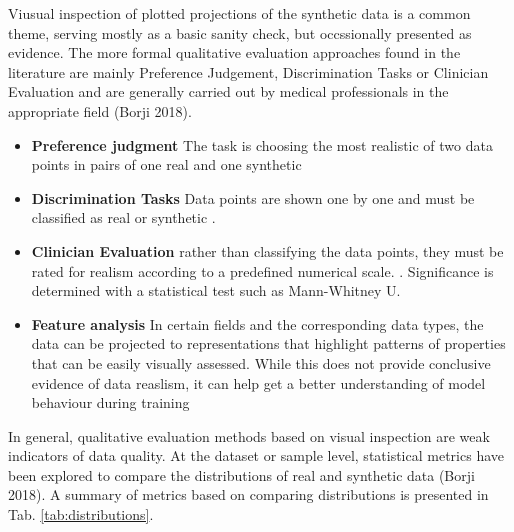         Viusual inspection of plotted projections of the synthetic data is a common theme, serving mostly as a basic sanity check, but occssionally presented as evidence. The more formal qualitative evaluation approaches found in the literature are mainly Preference Judgement, Discrimination Tasks or Clinician Evaluation and are generally carried out by medical professionals in the appropriate field (Borji 2018).
            \begin{itemize}
                \item \textbf{Preference judgment} The task is choosing the most realistic of two data points in pairs of one real and one synthetic \cite{Choi2017-nt}
                \item \textbf{Discrimination Tasks} Data points are shown one by one and must be classified as real or synthetic \cite{Beaulieu-Jones2019-ct}.
                \item \textbf{Clinician Evaluation} rather than classifying the data points, they must be rated for realism according to a predefined numerical scale. \cite{Beaulieu-Jones2019-ct}. Significance is determined with a statistical test such as Mann-Whitney U.
                \item \textbf{Feature analysis} In certain fields and the corresponding data types, the data can be projected to representations that highlight patterns of properties that can be easily visually assessed. While this does not provide conclusive evidence of data reaslism, it can help get a better understanding of model behaviour during training 
            \end{itemize}

        In general, qualitative evaluation methods based on visual inspection are weak indicators of data quality. At the dataset or sample level, statistical metrics have been explored to compare the distributions of real and synthetic data (Borji 2018). A summary of metrics based on comparing distributions is presented in Tab. \ref{tab:distributions}.
        
        

